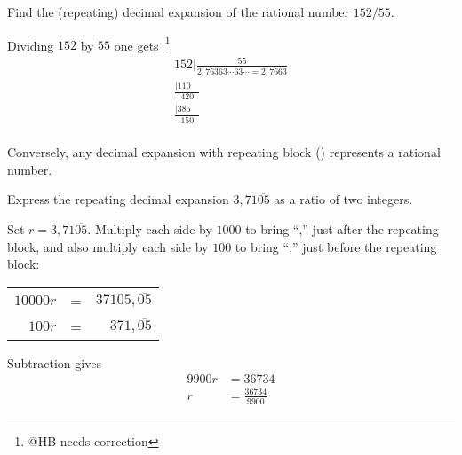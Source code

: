\documentclass[11pt]{amsbook}
\begin{document}
\begin{exmp}
	Find the (repeating) decimal expansion of 
	the rational number $152/55$.
	
	Dividing $152$ by $55$ one gets~\footnote{@HB needs correction}
	\[
		\begin{array}{lr}
		152|\frac{55}{2,76363\cdots 63\cdots =2,76\overline{63}} \\
		\frac{|110\quad}{420} \\
		\frac{|385\quad}{150} \\
		\end{array}
	\]
\end{exmp}

Conversely, any decimal expansion with repeating block () represents a rational number.

\begin{exmp}
	Express the repeating decimal expansion 
	$3,71\overline{05}$ as a ratio of two integers.
	\begin{hSolution}
		Set $r = 3,71\overline{05}$.
		Multiply each side by $1000$ to bring ``,'' 
		just after the repeating block, 
		and also multiply each side by $100$ to bring ``,'' 
		just before the repeating block:
		\begin{center}
		\begin{tabular}{rlr}
			$10000 r$	&= 	&$37105,\overline{05}$ \\
			$100 r$ 	&= 	&$371,\overline{05}$ \\
		\end{tabular}
		\end{center}
		
		Subtraction gives
		\begin{align*}
			9900 r &= 36734 \\
			r &= \frac{36734}{9900}
		\end{align*}
	\end{hSolution}
\end{exmp}
\end{document}
